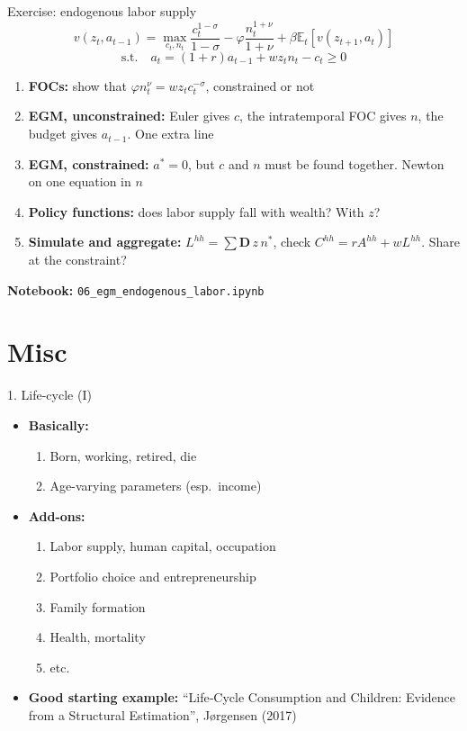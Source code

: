 \documentclass[
  10pt,
  ignorenonframetext,
  aspectratio=43,
  english,
]{beamer}
\providecommand{\tightlist}{%
  \setlength{\itemsep}{0pt}\setlength{\parskip}{0pt}}
\begin{document}
\begin{frame}[fragile]{Exercise: endogenous labor supply}
\protect{}\label{exercise-endogenous-labor-supply}
\[
v(z_{t},a_{t-1})=\max_{c_{t},n_{t}}\frac{c_{t}^{1-\sigma}}{1-\sigma}-\varphi\frac{n_{t}^{1+\nu}}{1+\nu}+\beta\mathbb{E}_{t}\left[v(z_{t+1},a_{t})\right]
\]
\[
\text{s.t.}\quad a_{t}=(1+r)a_{t-1}+wz_{t}n_{t}-c_{t}\geq0
\]

\begin{enumerate}
\tightlist
\item
  \textbf{FOCs:} show that \(\varphi n_{t}^{\nu}=wz_{t}c_{t}^{-\sigma}\), constrained or not
\item
  \textbf{EGM, unconstrained:} Euler gives \(c\), the intratemporal FOC gives \(n\), the budget gives \(a_{t-1}\). One extra line
\item
  \textbf{EGM, constrained:} \(a^{\ast}=0\), but \(c\) and \(n\) must be found together. Newton on one equation in \(n\)
\item
  \textbf{Policy functions:} does labor supply fall with wealth? With \(z\)?
\item
  \textbf{Simulate and aggregate:} \(L^{hh}=\sum\boldsymbol{D}\,z\,n^{\ast}\), check \(C^{hh}=rA^{hh}+wL^{hh}\). Share at the constraint?
\end{enumerate}

\textbf{Notebook:} \texttt{06\_egm\_endogenous\_labor.ipynb}
\end{frame}

\section{Misc}\label{misc}

\begin{frame}{1. Life-cycle (I)}
\protect{}\label{life-cycle-i}
\begin{itemize}
\tightlist
\item
  \textbf{Basically:}

  \begin{enumerate}
  \tightlist
  \item
    Born, working, retired, die
  \item
    Age-varying parameters (esp.~income)
  \end{enumerate}
\item
  \textbf{Add-ons:}

  \begin{enumerate}
  \tightlist
  \item
    Labor supply, human capital, occupation
  \item
    Portfolio choice and entrepreneurship
  \item
    Family formation
  \item
    Health, mortality
  \item
    etc.
  \end{enumerate}
\item
  \textbf{Good starting example:} ``Life‐Cycle Consumption and Children:
  Evidence from a Structural Estimation'', Jørgensen (2017)
\end{itemize}
\end{frame}
\end{document}
